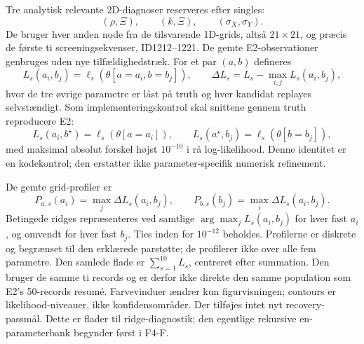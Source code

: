Tre analytisk relevante 2D-diagnoser reserveres efter singles:
\[
 (\rho,\Xi),\qquad(k,\Xi),\qquad(\sigma_X,\sigma_Y).
\]
De bruger hver anden node fra de tilsvarende 1D-grids, altså \(21\times21\), og
præcis de første ti screeningsekvenser, ID1212--1221. De gemte E2-observationer
genbruges uden nye tilfældighedstræk. For et par \((a,b)\) defineres
\[
 L_s(a_i,b_j)=\ell_s(\theta[a=a_i,b=b_j]),\qquad
 \Delta L_s=L_s-\max_{i,j}L_s(a_i,b_j),
\]
hvor de tre øvrige parametre er låst på truth og hver kandidat replayes selvstændigt.
Som implementeringskontrol skal snittene gennem truth reproducere E2:
\[
 L_s(a_i,b^\star)=\ell_s(\theta[a=a_i]),\qquad
 L_s(a^\star,b_j)=\ell_s(\theta[b=b_j]),
\]
med maksimal absolut forskel højst \(10^{-10}\) i rå log-likelihood. Denne identitet
er en kodekontrol; den erstatter ikke parameter-specifik numerisk refinement.

De gemte grid-profiler er
\[
 P_{a,s}(a_i)=\max_j\Delta L_s(a_i,b_j),\qquad
 P_{b,s}(b_j)=\max_i\Delta L_s(a_i,b_j).
\]
Betingede ridges repræsenteres ved samtlige \(\arg\max_jL_s(a_i,b_j)\) for hver
fast \(a_i\), og omvendt for hver fast \(b_j\). Ties inden for \(10^{-12}\) beholdes.
Profilerne er diskrete og begrænset til den erklærede parstøtte; de profilerer
ikke over alle fem parametre. Den samlede flade er \(\sum_{s=1}^{10}L_s\), centreret
efter summation. Den bruger de samme ti records og er derfor ikke direkte den samme
population som E2's 50-records resumé. Farvevinduer ændrer kun figurvisningen;
contours er likelihood-niveauer, ikke konfidensområder. Der tilføjes intet nyt
recovery-passmål. Dette er flader til ridge-diagnostik; den egentlige rekursive
en-parameterbank begynder først i F4-F.

